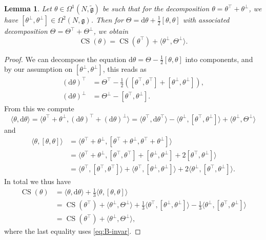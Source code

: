 \documentclass[british,11pt,a4paper]{amsart}
\numberwithin{equation}{section}
\renewcommand{\th}{\theta}
\newcommand{\Om}{\Omega}
\newcommand{\B}[2]{\langle#1,#2\rangle}
\newcommand{\CS}{\operatorname{CS}}
\renewcommand*{\d}{\mathrm{d}}
\newcounter{theorem}
\numberwithin{theorem}{section}
\newtheorem{lemma}[theorem]{Lemma}
\theoremstyle{definition}
\theoremstyle{remark}
\begin{document}
\begin{lemma}\label{lem:CS-pairs}
Let $\th\in\Om^1(N,\mathfrak{\tilde{g}})$ be such that for the decomposition
$\th=\th^\top+\th^\perp$, we have
$[\th^\perp,\th^\perp]\in\Om^2(N,\mathfrak{g})$. Then for
$\Theta=\d\th+\frac12[\th,\th]$ with associated decomposition
$\Theta=\Theta^\top+\Theta^\perp$, we obtain
\begin{equation}\label{eqn:partialblindness}
\CS(\th)=\CS(\th^\top)+\B{\th^\perp}{\Theta^\perp}. 
\end{equation}
\end{lemma}
\begin{proof}
We can decompose the equation $\d\th=\Theta-\frac12[\th,\th]$ into components, and by
our assumption on $[\th^\perp,\th^\perp]$, this reads as
\begin{equation}\label{eq:dth-decomp}
\begin{aligned}
(\d\th)^\top&=\Theta^\top-\tfrac12([\th^\top,\th^\top]+[\th^\perp,\th^\perp]),\\
(\d\th)^\perp&=\Theta^\perp-[\th^\top,\th^\perp].
\end{aligned}
\end{equation}
From this we compute
\[
\B{\theta}{\d\theta}=\B{\theta^{\top}+\theta^{\perp}}{(\d\theta)^{\top}+(\d\theta)^{\perp}}=\B{\theta^{\top}}{\d\theta^{\top}}-\B{\theta^{\perp}}{[\theta^{\top},\theta^{\perp}]}+\B{\theta^{\perp}}{\Theta^{\perp}}
\]
and
\[
\begin{aligned}
\B{\theta}{[\theta,\theta]}&=\B{\theta^{\top}+\theta^{\perp}}{[\theta^{\top}+\theta^{\perp},\theta^{\top}+\theta^{\perp}]}\\
&=\B{\theta^{\top}+\theta^{\perp}}{[\theta^{\top},\theta^{\top}]+[\theta^{\perp},\theta^{\perp}]+2[\theta^{\top},\theta^{\perp}]}\\
&=\B{\theta^{\top}}{[\theta^{\top},\theta^{\top}]}+\B{\theta^{\top}}{[\theta^{\perp},\theta^{\perp}]}+2\B{\theta^{\perp}}{[\theta^{\top},\theta^{\perp}]}.
\end{aligned}
\]
In total we thus have
\[
\begin{aligned}
\CS(\theta)&=\B{\theta}{\d\theta}+\tfrac{1}{3}\B{\theta}{[\theta,\theta]}\\
&=\CS(\theta^{\top})+\B{\theta^{\perp}}{\Theta^{\perp}}+\tfrac{1}{3}\B{\theta^{\top}}{[\theta^{\perp},\theta^{\perp}]}-\tfrac{1}{3}\B{\theta^{\perp}}{[\theta^{\top},\theta^{\perp}]}\\
&=\CS(\theta^{\top})+\B{\theta^{\perp}}{\Theta^{\perp}},
\end{aligned}
\]
where the last equality uses \eqref{eq:B-invar}. 
\end{proof}
\end{document}
